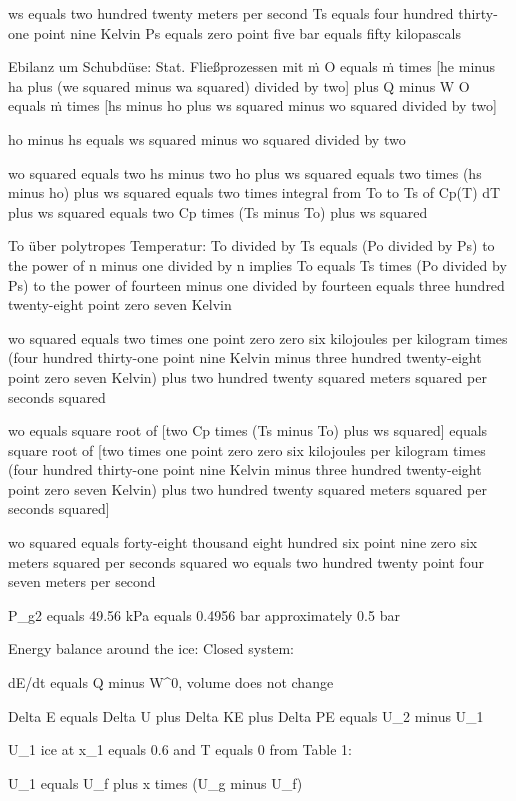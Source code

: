 ws equals two hundred twenty meters per second  
Ts equals four hundred thirty-one point nine Kelvin  
Ps equals zero point five bar equals fifty kilopascals  

Ebilanz um Schubdüse: Stat. Fließprozessen mit ṁ  
O equals ṁ times [he minus ha plus (we squared minus wa squared) divided by two] plus Q minus W  
O equals ṁ times [hs minus ho plus ws squared minus wo squared divided by two]  

ho minus hs equals ws squared minus wo squared divided by two  

wo squared equals two hs minus two ho plus ws squared  
equals two times (hs minus ho) plus ws squared  
equals two times integral from To to Ts of Cp(T) dT plus ws squared  
equals two Cp times (Ts minus To) plus ws squared  

To über polytropes Temperatur:  
To divided by Ts equals (Po divided by Ps) to the power of n minus one divided by n  
implies To equals Ts times (Po divided by Ps) to the power of fourteen minus one divided by fourteen  
equals three hundred twenty-eight point zero seven Kelvin  

wo squared equals two times one point zero zero six kilojoules per kilogram times (four hundred thirty-one point nine Kelvin minus three hundred twenty-eight point zero seven Kelvin) plus two hundred twenty squared meters squared per seconds squared  

wo equals square root of [two Cp times (Ts minus To) plus ws squared] equals square root of [two times one point zero zero six kilojoules per kilogram times (four hundred thirty-one point nine Kelvin minus three hundred twenty-eight point zero seven Kelvin) plus two hundred twenty squared meters squared per seconds squared]  

wo squared equals forty-eight thousand eight hundred six point nine zero six meters squared per seconds squared  
wo equals two hundred twenty point four seven meters per second

P_g2 equals 49.56 kPa equals 0.4956 bar approximately 0.5 bar

Energy balance around the ice: Closed system:

dE/dt equals Q minus W^0, volume does not change

Delta E equals Delta U plus Delta KE plus Delta PE equals U_2 minus U_1

U_1 ice at x_1 equals 0.6 and T equals 0 from Table 1:

U_1 equals U_f plus x times (U_g minus U_f)

